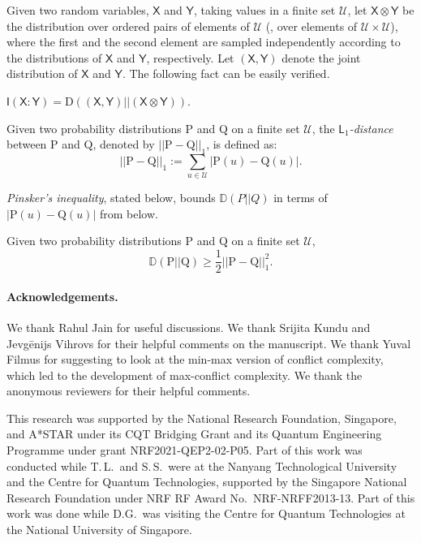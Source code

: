 \documentclass{toc}
\newcommand{\D}{\mathbb{D}}
\newcommand{\Div}{\text{D}}
\newcommand{\clU}{\mathcal{U}}
\newcommand{\X}{\mathsf{X}}
\newcommand{\Y}{\mathsf{Y}}
\newcommand{\I}{\mathsf{I}}
\newcommand{\ccc}{max-conflict complexity}
\begin{document}
Given two random variables, $\X$ and $\Y$, taking values in a finite set $\clU$,
%
let  %
$\X \otimes \Y$ be
the  %
distribution over ordered pairs of elements of $\clU$ (\ie, over elements of $\clU \times \clU$), where the %
first and the second element  %
are sampled independently according to
the  %
distributions of $\X$ and $\Y$, respectively. Let $(\X,\Y)$ denote the joint distribution of $\X$ and $\Y$. The following fact can be easily verified.
\begin{fact}
\label{equivalence}
$\I(\X:\Y)=\Div((\X,\Y) || (\X \otimes \Y))$.
\end{fact}
\begin{definition}
\label{l1n}
Given two probability distributions $\text{P}$ and $\text{Q}$ on a finite set $\clU$, the \emph{$\mathsf{L}_1$-distance} between $\text{P}$ and $\text{Q}$, denoted by $||\text{P}-\text{Q}||_1$, is defined as:
\[||\text{P}-\text{Q}||_1:=\sum_{u \in \clU}|\text{P}(u)-\text{Q}(u)|.\]
\end{definition}
\emph{Pinsker's inequality}, stated below, bounds $\D(P || Q)$ in terms of $|\text{P}(u)-\text{Q}(u)|$ from below.
\begin{theorem}
\label{pinskers}
Given two probability distributions $\text{P}$ and $\text{Q}$ on a finite set $\clU$,
\[\D(\text{P} || \text{Q}) \geq \frac{1}{2} ||\text{P}-\text{Q}||^2_1.\]
\end{theorem}


\paragraph*{Acknowledgements.} We thank Rahul Jain for useful discussions. We thank Srijita Kundu and Jevg\={e}nijs Vihrovs for their helpful comments on the manuscript.  We thank Yuval Filmus for 
suggesting to look at the min-max version of conflict complexity, which led to the development of \ccc. We thank the anonymous reviewers for their helpful comments.

%
This research was supported by the National Research Foundation, Singapore, and A*STAR under its CQT Bridging Grant and its Quantum Engineering Programme under grant NRF2021-QEP2-02-P05.
%
Part of this work was conducted while T.\,L.\ and S.\,S.\ were at the Nanyang Technological University and the Centre for Quantum Technologies, supported by the Singapore National Research Foundation under NRF RF Award No.\ 
NRF-NRFF2013-13. Part of this work was done while D.G.\ was visiting the Centre for Quantum Technologies at the National University of Singapore.
\end{document}
